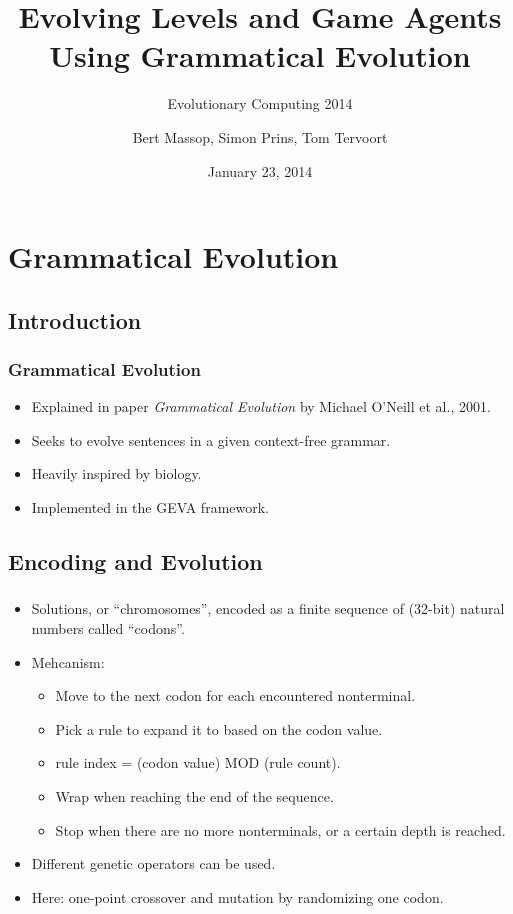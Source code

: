 \documentclass{beamer}
\title{Evolving Levels and Game Agents Using Grammatical Evolution}
\subtitle{Evolutionary Computing 2014}
\author{Bert Massop, Simon Prins, Tom Tervoort}
\date{January 23, 2014}
\makeatletter
\newcommand*{\currentname}{\@currentlabelname}
\makeatother
\begin{document}
\begin{frame}
\titlepage
\end{frame}

\section{Grammatical Evolution}
\subsection{Introduction}
\begin{frame}
\frametitle{Grammatical Evolution}
\begin{itemize}
\item Explained in paper \textit{Grammatical Evolution} by Michael O'Neill et al., 2001.
\item Seeks to evolve sentences in a given context-free grammar.
\item Heavily inspired by biology.
\item Implemented in the GEVA framework.
\end{itemize}
\end{frame}

\subsection{Encoding and Evolution}
\begin{frame}
\frametitle{\currentname}
\begin{itemize}
\item Solutions, or ``chromosomes'', encoded as a finite sequence of (32-bit) natural numbers called ``codons''.
\item Mehcanism:
\begin{itemize}
	\item Move to the next codon for each encountered nonterminal.
	\item Pick a rule to expand it to based on the codon value.
	\item rule index = (codon value) MOD (rule count).
	\item Wrap when reaching the end of the sequence.
	\item Stop when there are no more nonterminals, or a certain depth is reached.
\end{itemize}
\end{itemize}
\begin{itemize}
	\item Different genetic operators can be used.
	\item Here: one-point crossover and mutation by randomizing one codon.
\end{itemize}

\end{frame}
\end{document}
